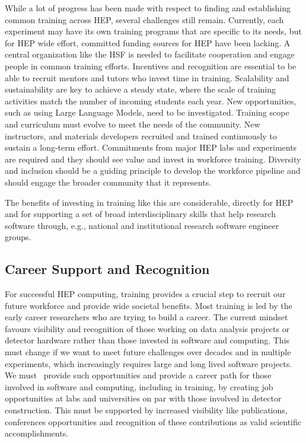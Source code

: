\documentclass[10pt,a4paper]{article}
\begin{document}
While a lot of progress has been made with respect to finding and establishing
common training across HEP, several challenges still remain. Currently, each
experiment may have its own training programs that are specific to its
needs, but for HEP wide effort, committed funding sources for HEP have been
lacking. A central organization like the HSF is needed to facilitate cooperation
and engage people in common training efforts. Incentives and recognition are
essential to be able to recruit mentors and tutors who invest time in training.
Scalability and sustainability are key to achieve a steady state, where the
scale of training activities match the number of incoming students each year.
New opportunities, such as using Large Language Models, need to be investigated.
Training scope and curriculum must evolve to meet the needs of the community.
New instructors, and materials developers recruited and trained continuously to
sustain a long-term effort. Commitments from major HEP labs and experiments are
required and they should see value and invest in workforce training. Diversity
and inclusion should be a guiding principle to develop the workforce pipeline
and should engage the broader community that it represents.

The benefits of investing in training like this are considerable, directly for
HEP and for supporting a set of broad interdisciplinary skills that help
research software through, e.g., national and institutional research software
engineer groups.

\subsection{Career Support and
Recognition}\label{career-support-and-recognition}

For successful HEP computing, training provides a crucial step to recruit our
future workforce and provide wide societal benefits. Most training is led by the
early career researchers who are trying to build a career. The current mindset
favours visibility and recognition of those working on data analysis projects or
detector hardware rather than those invested in software and computing. This
must change if we want to meet future challenges over decades and in multiple
experiments, which increasingly requires large and long lived software projects.
We must~\cite{hsfcwp} provide such opportunities and provide a career path for those
involved in software and computing, including in training, by creating job
opportunities at labs and universities on par with those involved in detector
construction. This must be supported by increased visibility like publications,
conferences opportunities and recognition of these contributions as valid
scientific accomplishments.
\end{document}
